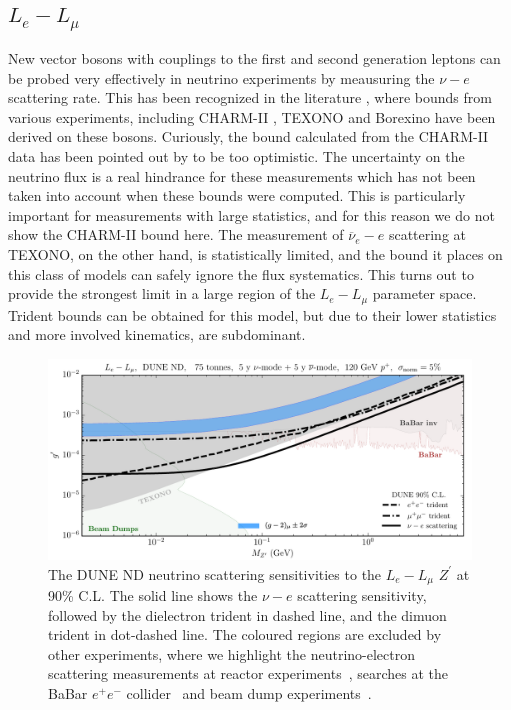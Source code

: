 \subsection{\boldmath${L_e - L_\mu}$ \label{sec:le_lbeta}}

New vector bosons with couplings to the first and second generation leptons can be probed very effectively in neutrino experiments by meausuring the $\nu-e$ scattering rate. This has been recognized in the literature \cite{Bilmis:2015lja,Lindner:2018kjo,Bauer:2018onh}, where bounds from various experiments, including CHARM-II \cite{Vilain:1994qy}, TEXONO \cite{Wong:2006nx,Deniz:2009mu,Chen:2014dsa} and Borexino \cite{Bellini:2011rx} have been derived on these bosons. Curiously, the bound calculated from the CHARM-II data has been pointed out by  to be too optimistic. The uncertainty on the neutrino flux is a real hindrance for these measurements which has not been taken into account when these bounds were computed. This is particularly important for measurements with large statistics, and for this reason we do not show the CHARM-II bound here. The measurement of $\overline{\nu}_e - e$ scattering at TEXONO, on the other hand, is statistically limited, and the bound it places on this class of models can safely ignore the flux systematics. This turns out to provide the strongest limit in a large region of the ${L_e - L_\mu}$ parameter space. Trident bounds can be obtained for this model, but due to their lower statistics and more involved kinematics, are subdominant.
%
\begin{figure}[h!]
\centering
\includegraphics[width=\textwidth]{lelmu.pdf}
 \caption[DUNE sensitivity to the $L_e-L_\mu$ model.]{The DUNE ND neutrino scattering sensitivities to the $L_e - L_\mu$ $Z^\prime$ at 90\% C.L. The solid line shows the $\nu-e$ scattering sensitivity, followed by the dielectron trident in dashed line, and the dimuon trident in dot-dashed line. The coloured regions are excluded by other experiments, where we highlight the neutrino-electron scattering measurements at reactor experiments~\cite{Wong:2006nx,Deniz:2009mu,Chen:2014dsa}, searches at the BaBar $e^+e^-$ collider~\cite{Lees:2014xha, Lees:2017lec} and beam dump experiments~\cite{Bauer:2018onh}.\label{fig:Le_Lmu}}
\end{figure}

